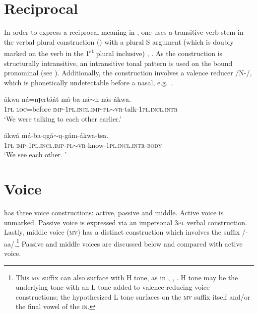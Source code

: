 \documentclass[output=paper]{langsci/langscibook}
\begin{document}
\section{Reciprocal}\label{sec:ahlandc:5}

In order to express a reciprocal meaning in , one uses a transitive verb stem in the verbal plural construction () with a plural S argument (which is doubly marked on the verb in the 1\textsuperscript{st} plural inclusive) , . As the construction is structurally intransitive, an intransitive tonal pattern is used on the bound pronominal (see ). Additionally, the construction involves a valence reducer /N-/, which is phonetically undetectable before a nasal, e.g.\ .

\ea\label{ex:ahlandc:43}
\gll
ákwa     ná=nɟertáát   má-ba-ná$\sim$n-nás-ákwa. \\
1\textsc{pl} \textsc{loc}=before     \textsc{imp-1pl.incl.imp}{}-\textsc{pl}$\sim$\textsc{vr}{}-talk-\textsc{1pl.incl.intr}\\
\glt
‘We were talking to each other earlier.’ 
\z

\ea\label{ex:ahlandc:44}
\gll
ákwá  má-ba-ŋgá$\sim$ŋ-gám-ákwa-tsa. \\
1\textsc{pl}   \textsc{imp-1pl.incl}.\textsc{imp}-\textsc{pl}{}$\sim$\textsc{vr-}know-\textsc{1pl.incl.intr-body} \\
\glt
 ‘We see each other. ’  
\z


\section{Voice}\label{sec:ahlandc:6}



 has three voice constructions: active, passive and middle. Active voice is unmarked. Passive voice is expressed via an impersonal \textsc{3pl} verbal construction. Lastly, middle voice (\textsc{mv}) has a distinct construction which involves the suffix /-aa/.\footnote{This \textsc{mv} suffix can also surface with H tone, as in , , . H tone may be the underlying tone with an L tone added to valence-reducing voice constructions; the hypothesized L tone surfaces on the \textsc{mv} suffix itself and/or the final vowel of the \textsc{in}.} Passive and middle voices are discussed below and compared with active voice.
\end{document}
